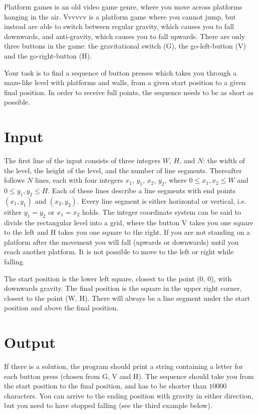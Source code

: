 

Platform games is an old video game genre, where you move across platforms hanging in the air. Vvvvvv is a platform game where you cannot jump, but instead are able to switch between regular gravity, which causes you to fall downwards, and anti-gravity, which causes you to fall upwards. There are only three buttons in the game: the gravitational switch (G), the go-left-button (V) and the go-right-button (H).

Your task is to find a sequence of button presses which takes you through a maze-like level with platforms and walls, from a given start position to a given final position. In order to receive full points, the sequence needs to be as short as possible.


\section*{Input}
The first line of the input consists of three integers $W$, $H$, and $N$: the width of the level, the height of the level, and the number of line segments. Thereafter follows $N$ lines, each with four integers $x_1$, $y_1$, $x_2$, $y_2$, where $0 \le x_1, x_2 \le W$ and $0 \le y_1, y_2 \le H$. Each of these lines describe a line segments with end points $(x_1, y_1)$ and $(x_2, y_2)$. Every line segment is either horizontal or vertical, i.e. either $y_1=y_2$ or $x_1=x_2$ holds. The integer coordinate system can be said to divide the rectangular level into a grid, where the button V takes you one square to the left and H takes you one square to the right. If you are not standing on a platform after the movement you will fall (upwards or downwards) until you reach another platform. It is not possible to move to the left or right while falling.

The start position is the lower left square, closest to the point (0, 0), with downwards gravity. The final position is the square in the upper right corner, closest to the point (W, H). There will always be a line segment under the start position and above the final position.


\section*{Output}

If there is a solution, the program should print a string containing a letter for each button press (chosen from G, V and H). The sequence should take you from the start position to the final position, and has to be shorter than $10000$ characters. You can arrive to the ending position with gravity in either direction, but you need to have stopped falling (see the third example below).

